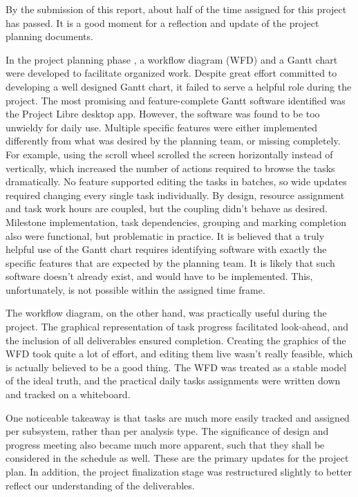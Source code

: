 
By the submission of this report, about half of the time assigned for this project has passed. It is a good moment for a reflection and update of the project planning documents.

In the project planning phase \cite{project_plan_vista}, a workflow diagram (WFD) and a Gantt chart were developed to facilitate organized work. Despite great effort committed to developing a well designed Gantt chart, it failed to serve a helpful role during the project. The most promising and feature-complete Gantt software identified was the Project Libre desktop app. However, the software was found to be too unwieldy for daily use. Multiple specific features were either implemented differently from what was desired by the planning team, or missing completely. For example, using the scroll wheel scrolled the screen horizontally instead of vertically, which increased the number of actions required to browse the tasks dramatically. No feature supported editing the tasks in batches, so wide updates required changing every single task individually. By design, resource assignment and task work hours are coupled, but the coupling didn't behave as desired. Milestone implementation, task dependencies, grouping and marking completion also were functional, but problematic in practice. It is believed that a truly helpful use of the Gantt chart requires identifying software with exactly the specific features that are expected by the planning team. It is likely that such software doesn't already exist, and would have to be implemented. This, unfortunately, is not possible within the assigned time frame.

The workflow diagram, on the other hand, was practically useful during the project. The graphical representation of task progress facilitated look-ahead, and the inclusion of all deliverables ensured completion. Creating the graphics of the WFD took quite a lot of effort, and editing them live wasn't really feasible, which is actually believed to be a good thing. The WFD was treated as a stable model of the ideal truth, and the practical daily tasks assignments were written down and tracked on a whiteboard. 

One noticeable takeaway is that tasks are much more easily tracked and assigned per subsystem, rather than per analysis type. The significance of design and progress meeting also became much more apparent, such that they shall be considered in the schedule as well. These are the primary updates for the project plan. In addition, the project finalization stage was restructured slightly to better reflect our understanding of the deliverables.

